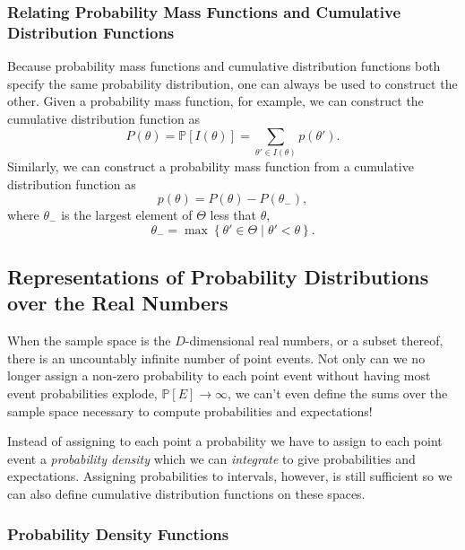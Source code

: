 \documentclass[11pt, oneside]{article}
\newcommand{\PP}{ \mathbb{P} }
\begin{document}
\subsubsection{Relating Probability Mass Functions and Cumulative 
Distribution Functions}

Because probability mass functions and cumulative distribution functions both
specify the same probability distribution, one can always be used to construct
the other.  Given a probability mass function, for example, we can construct
the cumulative distribution function as
%
\begin{equation*}
P \! \left( \theta \right)
= \PP \! \left[ I \! \left( \theta \right) \right]
= \sum_{\theta' \in I ( \theta )} p \! \left( \theta' \right).
\end{equation*}
%
Similarly, we can construct a probability mass function from a cumulative
distribution function as
%
\begin{equation*}
p \! \left( \theta \right) = 
P \! \left( \theta \right)
- P \! \left( \theta_{-} \right),
\end{equation*}
%
where $\theta_{-}$ is the largest element of $\Theta$ less that $\theta$,
%
\begin{equation*}
\theta_{-} = \max \left\{ \theta' \in \Theta \mid \theta' < \theta \right\}.
\end{equation*}

\subsection{Representations of Probability Distributions over the Real
Numbers}

When the sample space is the $D$-dimensional real numbers, or
a subset thereof, there is an uncountably infinite number of point events.  
Not only can we no longer assign a non-zero probability to each point 
event without having most event probabilities explode, $\PP \! \left[ E \right]
\rightarrow \infty$, we can't even define the sums over the sample space 
necessary to compute probabilities and expectations!  

Instead of assigning to each point a probability we have to assign  
to each point event a \emph{probability density}  which we can 
\emph{integrate} to give probabilities and expectations.  Assigning 
probabilities to intervals, however, is still sufficient so we can also 
define cumulative distribution functions on these spaces.

\subsubsection{Probability Density Functions}
\end{document}
